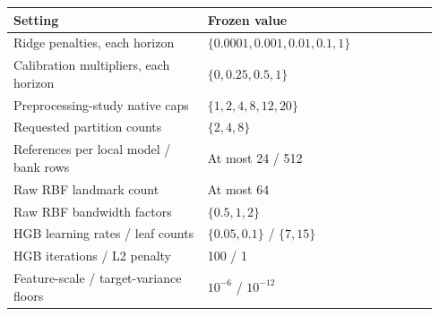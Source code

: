 \begin{tabular}{@{}p{0.43\linewidth}p{0.51\linewidth}@{}}
\toprule
Setting & Frozen value \\
\midrule
Ridge penalties, each horizon & $\{0.0001,0.001,0.01,0.1,1\}$ \\
Calibration multipliers, each horizon & $\{0,0.25,0.5,1\}$ \\
Preprocessing-study native caps & $\{1,2,4,8,12,20\}$ \\
Requested partition counts & $\{2,4,8\}$ \\
References per local model / bank rows & At most 24 / 512 \\
Raw RBF landmark count & At most 64 \\
Raw RBF bandwidth factors & $\{0.5,1,2\}$ \\
HGB learning rates / leaf counts & $\{0.05,0.1\}$ / $\{7,15\}$ \\
HGB iterations / L2 penalty & 100 / 1 \\
Feature-scale / target-variance floors & $10^{-6}$ / $10^{-12}$ \\
\bottomrule
\end{tabular}
